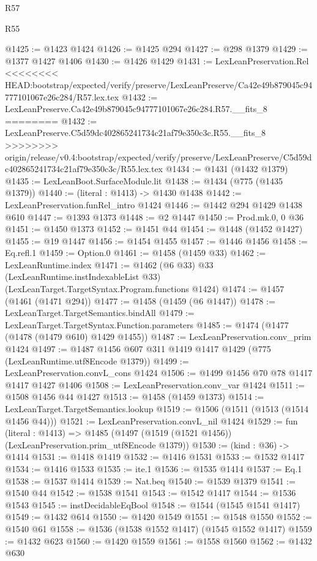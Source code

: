\begin{lexlean}{R57}
\begin{lexlean}{R55}
\begin{coremodule}
{{{{{{{{{{{{{{{{{{{{{{{{{{{{{{{{{{{{{{{{{{{{{{{{{{{{{{{{{{{{{{@1425 := @1423 @1424
@1426 := @1425 @294
@1427 := @298 @1379
@1429 := @1377 @1427 @1406
@1430 := @1426 @1429
@1431 := LexLeanPreservation.Rel
<<<<<<<< HEAD:bootstrap/expected/verify/preserve/LexLeanPreserve/Ca42e49b879045c94777101067e26c284/R57.lex.tex
@1432 := LexLeanPreserve.Ca42e49b879045c94777101067e26c284.R57.__fits_8
========
@1432 := LexLeanPreserve.C5d59dc402865241734c21af79e350c3c.R55.__fits_8
>>>>>>>> origin/release/v0.4:bootstrap/expected/verify/preserve/LexLeanPreserve/C5d59dc402865241734c21af79e350c3c/R55.lex.tex
@1434 := @1431 (@1432 @1379)
@1435 := LexLeanBoot.SurfaceModule.lit
@1438 := @1434 (@775 (@1435 @1379))
@1440 := (literal : @1413) -> @1430 @1438
@1442 := LexLeanPreservation.funRel_intro @1424
@1446 := @1442 @294 @1429 @1438 @610
@1447 := @1393 @1373
@1448 := @2 @1447
@1450 := Prod.mk.{0, 0} @36
@1451 := @1450 @1373
@1452 := @1451 @44
@1454 := @1448 (@1452 @1427)
@1455 := @19 @1447
@1456 := @1454 @1455
@1457 := @1446 @1456
@1458 := Eq.refl.{1}
@1459 := Option.{0}
@1461 := @1458 (@1459 @33)
@1462 := LexLeanRuntime.index
@1471 := @1462
    (@6 @33)
    @33
    (LexLeanRuntime.instIndexableList @33)
    (LexLeanTarget.TargetSyntax.Program.functions @1424)
@1474 := @1457 (@1461 (@1471 @294))
@1477 := @1458 (@1459 (@6 @1447))
@1478 := LexLeanTarget.TargetSemantics.bindAll
@1479 := LexLeanTarget.TargetSyntax.Function.parameters
@1485 := @1474 (@1477 (@1478 (@1479 @610) @1429 @1455))
@1487 := LexLeanPreservation.conv_prim @1424
@1497 := @1487 @1456 @607 @311 @1419 @1417 @1429 (@775 (LexLeanRuntime.utf8Encode @1379))
@1499 := LexLeanPreservation.convL_cons @1424
@1506 := @1499 @1456 @70 @78 @1417 @1417 @1427 @1406
@1508 := LexLeanPreservation.conv_var @1424
@1511 := @1508 @1456 @44 @1427
@1513 := @1458 (@1459 @1373)
@1514 := LexLeanTarget.TargetSemantics.lookup
@1519 := @1506 (@1511 (@1513 (@1514 @1456 @44)))
@1521 := LexLeanPreservation.convL_nil @1424
@1529 := fun (literal : @1413) =>
  @1485 (@1497 (@1519 (@1521 @1456)) (LexLeanPreservation.prim_utf8Encode @1379))
@1530 := (kind : @36) -> @1414
@1531 := @1418 @1419
@1532 := @1416 @1531
@1533 := @1532 @1417
@1534 := @1416 @1533
@1535 := ite.{1}
@1536 := @1535 @1414
@1537 := Eq.{1}
@1538 := @1537 @1414
@1539 := Nat.beq
@1540 := @1539 @1379
@1541 := @1540 @44
@1542 := @1538 @1541
@1543 := @1542 @1417
@1544 := @1536 @1543
@1545 := instDecidableEqBool
@1548 := @1544 (@1545 @1541 @1417)
@1549 := @1432 @614
@1550 := @1420 @1549
@1551 := @1548 @1550
@1552 := @1540 @61
@1558 := @1536 (@1538 @1552 @1417) (@1545 @1552 @1417)
@1559 := @1432 @623
@1560 := @1420 @1559
@1561 := @1558 @1560
@1562 := @1432 @630
}}}}}}}}}}}}}}}}}}}}}}}}}}}}}}}}}}}}}}}}}}}}}}}}}}}}}}}}}}}}}}
\end{coremodule}
\end{lexlean}
\end{lexlean}

